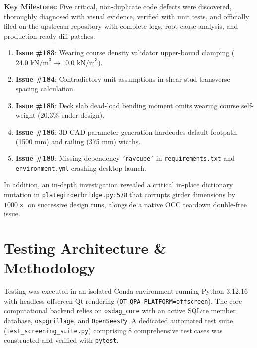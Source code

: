 \documentclass[11pt,a4paper]{article}
\begin{document}
\textbf{Key Milestone:} Five critical, non-duplicate code defects were discovered, thoroughly diagnosed with visual evidence, verified with unit tests, and officially filed on the upstream repository with complete logs, root cause analysis, and production-ready diff patches:
\begin{enumerate}[noitemsep,topsep=2pt]
    \item \textbf{Issue \#183}: Wearing course density validator upper-bound clamping ($24.0\text{ kN/m}^3 \to 10.0\text{ kN/m}^3$).
    \item \textbf{Issue \#184}: Contradictory unit assumptions in shear stud transverse spacing calculation.
    \item \textbf{Issue \#185}: Deck slab dead-load bending moment omits wearing course self-weight (20.3\% under-design).
    \item \textbf{Issue \#186}: 3D CAD parameter generation hardcodes default footpath (1500 mm) and railing (375 mm) widths.
    \item \textbf{Issue \#189}: Missing dependency \texttt{'navcube'} in \texttt{requirements.txt} and \texttt{environment.yml} crashing desktop launch.
\end{enumerate}
In addition, an in-depth investigation revealed a critical in-place dictionary mutation in \texttt{plategirderbridge.py:578} that corrupts girder dimensions by $1000\times$ on successive design runs, alongside a native OCC teardown double-free issue.

\section{Testing Architecture \& Methodology}
Testing was executed in an isolated Conda environment running Python 3.12.16 with headless offscreen Qt rendering (\texttt{QT\_QPA\_PLATFORM=offscreen}). The core computational backend relies on \texttt{osdag\_core} with an active SQLite member database, \texttt{ospgrillage}, and \texttt{OpenSeesPy}.
A dedicated automated test suite (\texttt{test\_screening\_suite.py}) comprising 8 comprehensive test cases was constructed and verified with \texttt{pytest}.
\end{document}
